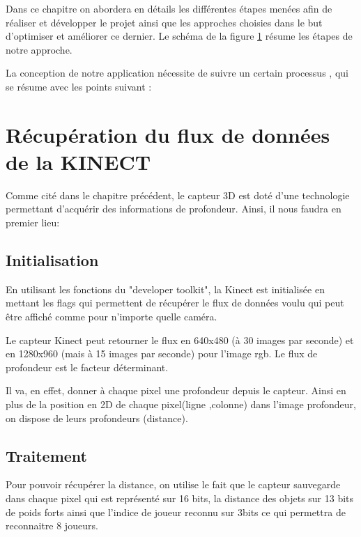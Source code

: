 \documentclass[12pt,a4paper,oneside]{book}
\begin{document}
	Dans ce chapitre on abordera en détails les différentes étapes menées afin de réaliser et développer le projet  ainsi que les approches choisies dans le but d'optimiser et améliorer ce dernier. Le schéma de la figure \ref{fig1a} résume les étapes de notre approche.
	
	
		\begin{figure}[H]
			\begin{center}
				
			\end{center}
			\label{fig1a}
		\end{figure}
	La conception de notre application nécessite de suivre un certain processus , qui se résume avec  les points suivant :
	
	\section{Récupération du flux de données de la KINECT}
	
	Comme cité dans le chapitre précédent, le capteur 3D est doté d'une technologie permettant d'acquérir des informations de profondeur. Ainsi, il nous faudra en premier lieu:
	
	\subsection{Initialisation}
	En utilisant les fonctions du "developer toolkit", la Kinect est initialisée en mettant les flags qui permettent de récupérer le flux de données voulu qui peut être affiché comme pour n’importe quelle caméra.
	
	Le capteur Kinect peut retourner le flux en 640x480 (à 30 images par seconde) et en 1280x960 (mais à 15 images par seconde) pour l'image rgb. Le flux de profondeur est le facteur déterminant. 
	
	Il va, en effet, donner à chaque pixel une profondeur depuis le capteur. Ainsi en plus de la position en 2D de chaque pixel(ligne ,colonne) dans l'image profondeur, on dispose de leurs profondeurs (distance).
	
	
	\subsection{Traitement }
	Pour pouvoir récupérer la distance, on utilise le fait que le capteur sauvegarde dans chaque pixel qui est représenté sur 16 bits, la distance des objets sur 13 bits de poids forts ainsi que l'indice de joueur reconnu sur 3bits ce qui permettra de reconnaitre 8 joueurs.
	
\end{document}

